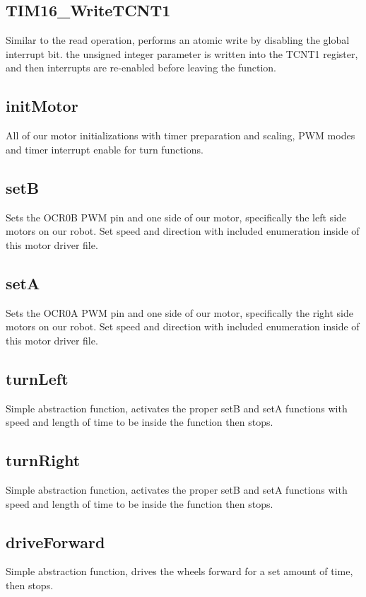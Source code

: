 \documentclass[letterpaper,11pt]{texMemo} %
\begin{document}
\subsection*{TIM16\_WriteTCNT1}
Similar to the read operation, performs an atomic write by disabling the global interrupt bit. the unsigned integer parameter is written into the TCNT1 register, and then interrupts are re-enabled before leaving the function.

\subsection*{initMotor}
All of our motor initializations with timer preparation and 
scaling, PWM modes and timer interrupt enable for turn functions.

\subsection*{setB}
Sets the OCR0B PWM pin and one side of our motor, specifically the 
left side motors on our robot. Set speed and direction with included 
enumeration inside of this motor driver file.

\subsection*{setA}
Sets the OCR0A PWM pin and one side of our motor, specifically the 
right side motors on our robot. Set speed and direction with included 
enumeration inside of this motor driver file.

\subsection*{turnLeft}
Simple abstraction function, activates the proper setB and setA functions 
with speed and length of time to be inside the function then stops.

\subsection*{turnRight}
Simple abstraction function, activates the proper setB and setA functions 
with speed and length of time to be inside the function then stops.

\subsection*{driveForward}
Simple abstraction function, drives the wheels forward for a set amount 
of time, then stops.
\end{document}
